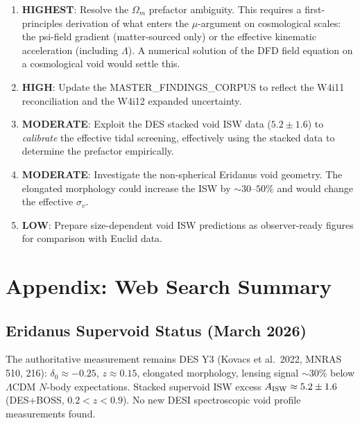 \documentclass[11pt,a4paper]{article}
\newcommand{\mufd}{\mu}
\newcommand{\Omm}{\Omega_m}
\begin{document}
\begin{enumerate}
\item \textbf{HIGHEST}: Resolve the $\Omm$ prefactor ambiguity.
  This requires a first-principles derivation of what enters the
  $\mufd$-argument on cosmological scales: the psi-field gradient
  (matter-sourced only) or the effective kinematic acceleration
  (including $\Lambda$). A numerical solution of the DFD field
  equation on a cosmological void would settle this.

\item \textbf{HIGH}: Update the MASTER\_FINDINGS\_CORPUS to reflect
  the W4i11 reconciliation and the W4i12 expanded uncertainty.

\item \textbf{MODERATE}: Exploit the DES stacked void ISW data
  ($5.2 \pm 1.6$) to \emph{calibrate} the effective tidal
  screening, effectively using the stacked data to determine the
  prefactor empirically.

\item \textbf{MODERATE}: Investigate the non-spherical Eridanus
  void geometry. The elongated morphology could increase the ISW
  by $\sim 30$--$50\%$ and would change the effective $\sigma_v$.

\item \textbf{LOW}: Prepare size-dependent void ISW predictions as
  observer-ready figures for comparison with Euclid data.
\end{enumerate}


\section*{Appendix: Web Search Summary}

\subsection*{Eridanus Supervoid Status (March 2026)}

The authoritative measurement remains DES Y3 (Kovacs et al.\ 2022,
MNRAS 510, 216): $\delta_0 \approx -0.25$, $z \approx 0.15$,
elongated morphology, lensing signal $\sim 30\%$ below $\Lambda$CDM
$N$-body expectations. Stacked supervoid ISW excess
$A_{\rm ISW} \approx 5.2 \pm 1.6$ (DES+BOSS, $0.2 < z < 0.9$).
No new DESI spectroscopic void profile measurements found.
\end{document}

